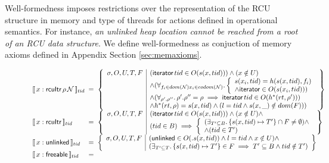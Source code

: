 Well-formedness imposes restrictions over the representation of the \textsf{RCU} structure in memory and type of threads for actions defined in operational semantics. For instance, \emph{an unlinked heap location cannot be reached from a root of an \textsf{RCU} data structure}. We define well-formedness as conjuction of memory axioms defined in Appendix Section \ref{sec:memaxioms}.
\begin{figure}\scriptsize
\[
\begin{array}{l@{\;\;=\;\;}l}
 \llbracket \, x : \textsf{rcuItr}\,\rho\,\N \,  \rrbracket_{tid}
&
\left\{
\begin{array}{l|l}
\sigma,O,U,T,F
&(\textsf{iterator} \, tid\in  O(s(x,tid)))  \land (x \notin U)  \\
& \land (\forall_{f_i\in dom(\N)  x_i\in codom(\N) } \ldotp
\left\{\begin{array}{l}  s(x_i,tid) = h(s(x,tid), f_i)  \\
 \land \textsf{iterator}\in O(s(x_i,tid)))\end{array} \right.\\
& \land  (\forall_{\rho', \rho''}\ldotp \rho'.\rho'' = \rho \implies  \textsf{iterator}\,tid \in O(h^{*}(rt,\rho'))) \\
& \land  h^{*}(rt,\rho)= s(x,tid)  \land (l = tid \land s(x,\_) \notin dom(F))) 
\end{array}
\right\}
\\
 \llbracket \, x : \textsf{rcuItr}\,  \rrbracket_{tid}
&
\left\{
\begin{array}{l|l}
\sigma,O,U,T,F
&(\textsf{iterator} \, tid\in  O(s(x,tid)))  \land (x \notin U) \land \\
& (tid \in B) \implies \left\{\begin{array}{l}( \exists_{T'\subseteq B}\ldotp \{s(x,tid) \mapsto T'\} \cap F \neq \emptyset) \land \\ \land (tid \in T') \end{array}\right.
\end{array}
\right\}
\\
\llbracket \, x : \textsf{unlinked} \, \rrbracket_{tid}
&
\left\{
\begin{array}{l|l}
\sigma,O,U,T,F
&(\textsf{unlinked}\in  O(.s(x,tid)) \land l = tid \land x \notin U) \land \\
& (\exists_{T'\subseteq T}\ldotp \{s(x,tid) \mapsto T'\}\in F \implies T' \subseteq B \land tid \notin T' )
\end{array}
\right\}
\\
\llbracket \, x : \textsf{freeable} \, \rrbracket_{tid}

\end{array}\]
\end{figure}
